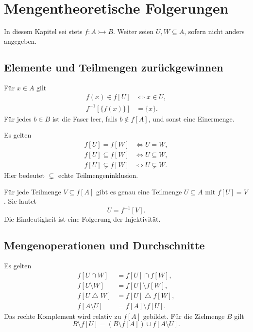 \chapter{Mengentheoretische Folgerungen}
\label{b06guide:ch:images}

In diesem Kapitel sei stets $f\colon A\rightarrowtail B$.
Weiter seien $U,W\subseteq A$, sofern nicht anders angegeben.

\section{Elemente und Teilmengen zurückgewinnen}

\begin{theorem}
\label{b06guide:thm:membership}
Für $x\in A$ gilt
\[
 \begin{aligned}
 f(x)\in f[U]&\Longleftrightarrow x\in U,\\
 f^{-1}[\{f(x)\}]&=\{x\}.
 \end{aligned}
\]
Für jedes $b\in B$ ist die Faser leer, falls $b\notin f[A]$,
und sonst eine Einermenge.
\end{theorem}

\begin{theorem}
\label{b06guide:thm:reflection}
Es gelten
\[
 \begin{aligned}
 f[U]=f[W]&\Longleftrightarrow U=W,\\
 f[U]\subseteq f[W]&\Longleftrightarrow U\subseteq W,\\
 f[U]\subsetneq f[W]&\Longleftrightarrow U\subsetneq W.
 \end{aligned}
\]
Hier bedeutet $\subsetneq$ echte Teilmengeninklusion.
\end{theorem}

\begin{theorem}
\label{b06guide:thm:uniquesubset}
Für jede Teilmenge $V\subseteq f[A]$ gibt es genau eine
Teilmenge $U\subseteq A$ mit $f[U]=V$. Sie lautet
\[
 U=f^{-1}[V].
\]
Die Eindeutigkeit ist eine Folgerung der Injektivität.
\end{theorem}

\section{Mengenoperationen und Durchschnitte}

\begin{theorem}
\label{b06guide:thm:operations}
Es gelten
\[
 \begin{aligned}
 f[U\cap W]&=f[U]\cap f[W],\\
 f[U\setminus W]&=f[U]\setminus f[W],\\
 f[U\mathbin{\triangle}W]&=f[U]\mathbin{\triangle}f[W],\\
 f[A\setminus U]&=f[A]\setminus f[U].
 \end{aligned}
\]
Das rechte Komplement wird relativ zu $f[A]$ gebildet.
Für die Zielmenge $B$ gilt
\[
 B\setminus f[U]
   =(B\setminus f[A])\cup f[A\setminus U].
\]
\end{theorem}

